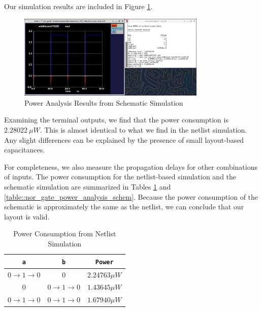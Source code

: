 \documentclass{article}
\begin{document}
	\noindent Our simulation results are included in Figure \ref{fig::nor_power_analysis_schem}.
	
	\begin{figure}[H]
		\centerline{\includegraphics[width=0.8\textwidth]{nor_power_analysis_schem.png}}
		\caption{Power Analysis Results from Schematic Simulation}
		\label{fig::nor_power_analysis_schem}
	\end{figure}
	
	\noindent Examining the terminal outputs, we find that the power consumption is $2.28022\ \mu{W}$. This is almost identical to what we find in the netlist simulation. Any slight differences can be explained by the presence of small layout-based capacitances.
	
	For completeness, we also measure the propagation delays for other combinations of inputs. The power consumption for the netlist-based simulation and the schematic simulation are summarized in Tables \ref{table::nor_gate_power_analysis} and \ref{table::nor_gate_power_analysis_schem}. Because the power consumption of the schematic is approximately the same as the netlist, we can conclude that our layout is valid.
	
	\begin{table}[H]
	\begin{center}
	\caption{Power Consumption from Netlist Simulation}
	\label{table::nor_gate_power_analysis}
	\begin{tabular}{| c | c | c |}
		\hline
		\texttt{a} & \texttt{b} & \texttt{Power}\\
		\hline	
		$0 \rightarrow 1 \rightarrow 0$ & $0$ & $2.24763{\mu}W$ \\
		\hline	
		$0$ & $0 \rightarrow 1 \rightarrow 0$ & $1.43645{\mu}W$ \\
		\hline	
		$0 \rightarrow 1 \rightarrow 0$ & $0 \rightarrow 1 \rightarrow 0$ & $1.67940{\mu}W$\\
		\hline
	\end{tabular}
	\end{center}
	\end{table}
	
\end{document}
